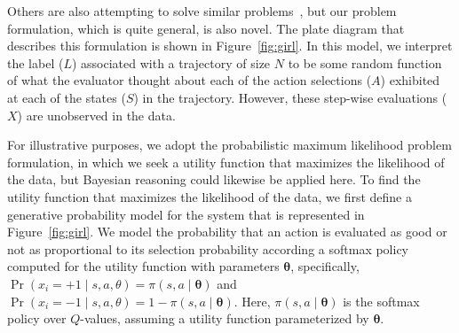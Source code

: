 Others are also attempting to solve similar problems~\cite{burchfiel2016distance,shiarlis2016inverse}, 
but our problem formulation, which is quite general, is also novel.
%
The plate diagram that describes this formulation is shown
in Figure~\ref{fig:girl}.  In this model, we interpret the label ($L$)
associated with a trajectory of size $N$ to be some random function of
what the evaluator thought about each of the action selections ($A$)
exhibited at each of the states ($S$) in the trajectory.  However,
these step-wise evaluations ($X$) are unobserved in the data.

For illustrative purposes, we adopt the probabilistic maximum
likelihood problem formulation, in which we seek a utility function
that maximizes the likelihood of the data, but Bayesian reasoning
could likewise be applied here.
%
To find the utility function that maximizes the likelihood of the data,
we first define a generative probability model for the system that is represented
in Figure~\ref{fig:girl}.
%
We model the probability that an action is evaluated as good or not as
proportional to its selection probability according a softmax policy
computed for the utility function with parameters
$\bm{\theta}$, specifically,
$\Pr(x_i = +1 \mid s, a, \theta) = \pi(s, a \mid \bm{\theta})$ and
$\Pr(x_i = -1 \mid s, a, \theta) = 1 - \pi(s, a \mid \bm{\theta})$.
%
Here, $\pi(s, a \mid \bm{\theta})$ is the softmax policy over $Q$-values,
assuming a utility function parameterized by $\bm{\theta}$.



